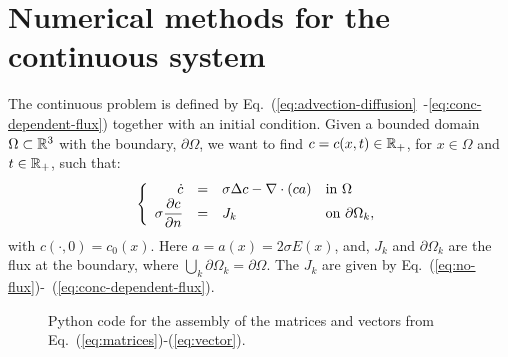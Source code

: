 \section{Numerical methods for the continuous system}
The continuous problem is defined by Eq.~(\ref{eq:advection-diffusion}~-\ref{eq:conc-dependent-flux}) together with an initial condition. Given a bounded domain $\Omega \subset \mathbb{R}^3$ with the boundary, $\partial\Omega$, we want to find $c = c(x,t) \in \mathbb{R}_+$, for $x\in \Omega$ and $t \in \mathbb{R}_+$, such that:
\begin{equation}
\label{eq:full_system}
\left\{
  \begin{array}{r@{\quad=\quad}ll}
    \dot{c}&\sigma\Delta c - \nabla\cdot\left(ca\right)&  \text{in } \Omega \\
    \sigma\diff[c]{n}&J_k& \text{on } \partial\Omega_k,
  \end{array}
\right.
\end{equation}
with $c(\cdot,0) = c_0(x)$. Here $a=a(x)=2\sigma E(x)$, and, $J_k$ and $\partial\Omega_k$ are the \kth flux at the \kth boundary, where $\bigcup_k\partial\Omega_k=\partial\Omega$. The $J_k$ are given by Eq.~(\ref{eq:no-flux})-~(\ref{eq:conc-dependent-flux}).\par

\begin{figure}
  \centering
  \vspace{-1.5em}
  \caption{Python code for the assembly of the matrices and vectors from Eq.~(\ref{eq:matrices})-(\ref{eq:vector}).}
  \label{fig:assembly-algorithm}
\end{figure}

